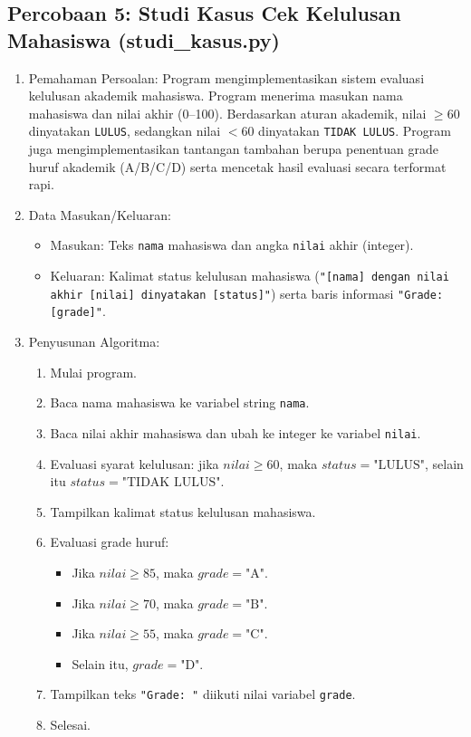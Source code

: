 \documentclass[12pt,a4paper]{article}
\begin{document}
\subsection{Percobaan 5: Studi Kasus Cek Kelulusan Mahasiswa (studi\_kasus.py)}
\begin{enumerate}
    \item Pemahaman Persoalan: Program mengimplementasikan sistem evaluasi kelulusan akademik mahasiswa. Program menerima masukan nama mahasiswa dan nilai akhir (0--100). Berdasarkan aturan akademik, nilai $\ge 60$ dinyatakan \texttt{LULUS}, sedangkan nilai $< 60$ dinyatakan \texttt{TIDAK LULUS}. Program juga mengimplementasikan tantangan tambahan berupa penentuan grade huruf akademik (A/B/C/D) serta mencetak hasil evaluasi secara terformat rapi.
    \item Data Masukan/Keluaran:
    \begin{itemize}
        \item Masukan: Teks \texttt{nama} mahasiswa dan angka \texttt{nilai} akhir (integer).
        \item Keluaran: Kalimat status kelulusan mahasiswa (\texttt{"[nama] dengan nilai akhir [nilai] dinyatakan [status]"}) serta baris informasi \texttt{"Grade: [grade]"}.
    \end{itemize}
    \item Penyusunan Algoritma:
    \begin{enumerate}[label=\alph*.]
        \item Mulai program.
        \item Baca nama mahasiswa ke variabel string \texttt{nama}.
        \item Baca nilai akhir mahasiswa dan ubah ke integer ke variabel \texttt{nilai}.
        \item Evaluasi syarat kelulusan: jika $nilai \ge 60$, maka $status = \text{"LULUS"}$, selain itu $status = \text{"TIDAK LULUS"}$.
        \item Tampilkan kalimat status kelulusan mahasiswa.
        \item Evaluasi grade huruf:
        \begin{itemize}
            \item Jika $nilai \ge 85$, maka $grade = \text{"A"}$.
            \item Jika $nilai \ge 70$, maka $grade = \text{"B"}$.
            \item Jika $nilai \ge 55$, maka $grade = \text{"C"}$.
            \item Selain itu, $grade = \text{"D"}$.
        \end{itemize}
        \item Tampilkan teks \texttt{"Grade: "} diikuti nilai variabel \texttt{grade}.
        \item Selesai.
    \end{enumerate}
\end{enumerate}
\end{document}
